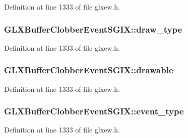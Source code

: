 Definition at line 1333 of file glxew.\+h.

\hypertarget{struct_g_l_x_buffer_clobber_event_s_g_i_x_a25c31e8cbec0919f74a1e93ae74175b1}{}
\subsubsection[{draw\+\_\+type}]{ G\+L\+X\+Buffer\+Clobber\+Event\+S\+G\+I\+X\+::draw\+\_\+type}\label{struct_g_l_x_buffer_clobber_event_s_g_i_x_a25c31e8cbec0919f74a1e93ae74175b1}


Definition at line 1333 of file glxew.\+h.

\hypertarget{struct_g_l_x_buffer_clobber_event_s_g_i_x_a9c45674193ed80a79261c3b7518ee04f}{}
\subsubsection[{drawable}]{ G\+L\+X\+Buffer\+Clobber\+Event\+S\+G\+I\+X\+::drawable}\label{struct_g_l_x_buffer_clobber_event_s_g_i_x_a9c45674193ed80a79261c3b7518ee04f}


Definition at line 1333 of file glxew.\+h.

\hypertarget{struct_g_l_x_buffer_clobber_event_s_g_i_x_a0b405123f1d6528f1f4dfa7ff92bde9b}{}
\subsubsection[{event\+\_\+type}]{ G\+L\+X\+Buffer\+Clobber\+Event\+S\+G\+I\+X\+::event\+\_\+type}\label{struct_g_l_x_buffer_clobber_event_s_g_i_x_a0b405123f1d6528f1f4dfa7ff92bde9b}


Definition at line 1333 of file glxew.\+h.


